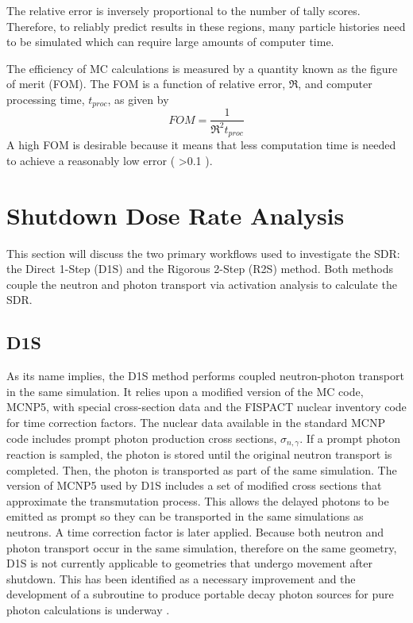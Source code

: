 The relative error is inversely proportional to the number of tally scores.
Therefore, to reliably predict results in these regions, many particle
histories need to be simulated which can require large amounts of computer time.

The efficiency of MC calculations is measured by a quantity known as the figure of merit
(FOM).  The FOM is a function of relative error, $\Re$, and computer processing
time, $t_{proc}$, 
as given by
\begin{equation} \label{eq:1.3}
	FOM = \frac{1}{{{{\Re}^2}t_{proc}}}
\end{equation}
A high FOM is desirable because it means that less computation time is needed to achieve
a reasonably low error ( >0.1 \cite{mcnp_manual}). 

\section{Shutdown Dose Rate Analysis}\label{sec:sdr_calcs}
This section will discuss the two primary workflows used to investigate the SDR:
the Direct 1-Step (D1S) \cite{d1s} and the Rigorous 2-Step (R2S) \cite{r2s}
method.  Both methods couple the neutron and photon transport via activation
analysis to calculate the SDR.

\subsection{D1S}
As its name implies, the D1S method performs coupled neutron-photon transport
in the same simulation.  It relies upon a modified version of the MC code,
MCNP5, with special cross-section data and the FISPACT nuclear inventory code
for time correction factors.  
The nuclear data available in the standard MCNP code includes prompt photon 
production cross sections, $\sigma_{n,\gamma}$.
If a prompt photon reaction is sampled,
the photon is stored until the original neutron transport is
completed. Then, the photon is transported as part of the same simulation.
The version of MCNP5 used by D1S includes a set of modified cross sections that
approximate the transmutation process.  This allows the delayed 
photons to be emitted as prompt so they can be transported in the same simulations
as neutrons. A time correction factor is later applied.
Because both neutron and photon transport occur in the same simulation,
therefore on the same geometry, D1S
is not currently applicable to geometries that undergo movement after shutdown.
This has been identified as a necessary improvement and the development of a
subroutine to produce portable decay photon sources for pure photon
calculations is underway \cite{adv-d1s}. 

